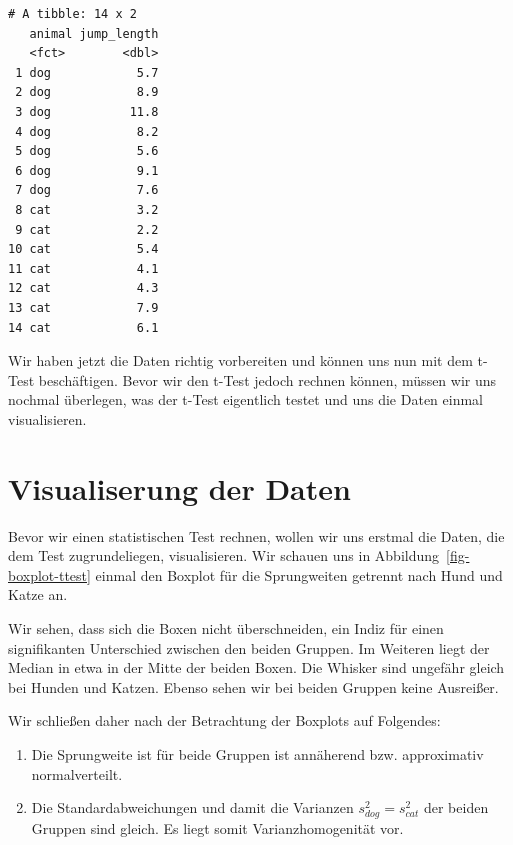 \documentclass[
  letterpaper,
  DIV=11,
  oneside]{scrreport}
\providecommand{\tightlist}{%
  \setlength{\itemsep}{0pt}\setlength{\parskip}{0pt}}\usepackage{longtable,booktabs,array}
\begin{document}
\begin{verbatim}
# A tibble: 14 x 2
   animal jump_length
   <fct>        <dbl>
 1 dog            5.7
 2 dog            8.9
 3 dog           11.8
 4 dog            8.2
 5 dog            5.6
 6 dog            9.1
 7 dog            7.6
 8 cat            3.2
 9 cat            2.2
10 cat            5.4
11 cat            4.1
12 cat            4.3
13 cat            7.9
14 cat            6.1
\end{verbatim}

Wir haben jetzt die Daten richtig vorbereiten und können uns nun mit dem
t-Test beschäftigen. Bevor wir den t-Test jedoch rechnen können, müssen
wir uns nochmal überlegen, was der t-Test eigentlich testet und uns die
Daten einmal visualisieren.

\hypertarget{visualiserung-der-daten}{%
\section{Visualiserung der Daten}\label{visualiserung-der-daten}}

Bevor wir einen statistischen Test rechnen, wollen wir uns erstmal die
Daten, die dem Test zugrundeliegen, visualisieren. Wir schauen uns in
Abbildung~\ref{fig-boxplot-ttest} einmal den Boxplot für die
Sprungweiten getrennt nach Hund und Katze an.

Wir sehen, dass sich die Boxen nicht überschneiden, ein Indiz für einen
signifikanten Unterschied zwischen den beiden Gruppen. Im Weiteren liegt
der Median in etwa in der Mitte der beiden Boxen. Die Whisker sind
ungefähr gleich bei Hunden und Katzen. Ebenso sehen wir bei beiden
Gruppen keine Ausreißer.

Wir schließen daher nach der Betrachtung der Boxplots auf Folgendes:

\begin{enumerate}
\def\labelenumi{\arabic{enumi})}
\tightlist
\item
  Die Sprungweite ist für beide Gruppen ist annäherend bzw. approximativ
  normalverteilt.
\item
  Die Standardabweichungen und damit die Varianzen
  \(s^2_{dog} = s^2_{cat}\) der beiden Gruppen sind gleich. Es liegt
  somit Varianzhomogenität vor.
\end{enumerate}
\end{document}
